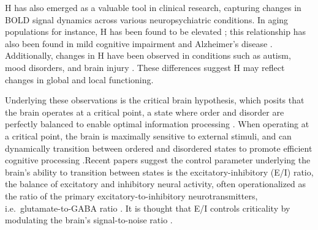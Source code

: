 \documentclass[
true
]{sn-jnl}
\begin{document}
H has also emerged as a valuable tool in clinical research, capturing
changes in BOLD signal dynamics across various neuropsychiatric
conditions. In aging populations for instance, H has been found to be
elevated
\citep{dongHurstExponentAnalysis2018, winkAgeCholinergicEffects2006};
this relationship has also been found in mild cognitive impairment and
Alzheimer's disease
\citep{maximFractionalGaussianNoise2005, longBrainnetomeAtlasBased2018}.
Additionally, changes in H have been observed in conditions such as
autism, mood disorders, and brain injury
\citep{laiShiftRandomnessBrain2010, donaTemporalFractalAnalysis2017, weiIdentifyingMajorDepressive2013, jingIdentifyingCurrentRemitted2017, donaFractalAnalysisBrain2017}.
These differences suggest H may reflect changes in global and local
functioning.

Underlying these observations is the critical brain hypothesis, which
posits that the brain operates at a critical point, a state where order
and disorder are perfectly balanced to enable optimal information
processing
\citep{decoRestingBrainsNever2013, beggsBeingCriticalCriticality2012, barangerChaosComplexityEntropy2000, bassettUnderstandingComplexityHuman2011, zimmernWhyBrainCriticality2020, liangExcitationInhibitionBalance2024, poilCriticalStateDynamicsAvalanches2012, lombardiBalanceExcitationInhibition2017, baumgartenCriticalExcitationinhibitionBalance2019, bruiningMeasurementExcitationinhibitionRatio2020, trakoshisIntrinsicExcitationinhibitionImbalance, gaoInferringSynapticExcitation2017, tianTheoreticalFoundationsStudying2022, rubinovNeurobiologicallyRealisticDeterminants2011}.
When operating at a critical point, the brain is maximally sensitive to
external stimuli, and can dynamically transition between ordered and
disordered states to promote efficient cognitive processing
\citep{decoRestingBrainsNever2013, beggsBeingCriticalCriticality2012, tianTheoreticalFoundationsStudying2022, rubinovNeurobiologicallyRealisticDeterminants2011}.Recent
papers suggest the control parameter underlying the brain's ability to
transition between states is the excitatory-inhibitory (E/I) ratio, the
balance of excitatory and inhibitory neural activity, often
operationalized as the ratio of the primary excitatory-to-inhibitory
neurotransmitters, i.e.~glutamate-to-GABA ratio
\citep{liangExcitationInhibitionBalance2024, lombardiBalanceExcitationInhibition2017, baumgartenCriticalExcitationinhibitionBalance2019, bruiningMeasurementExcitationinhibitionRatio2020, trakoshisIntrinsicExcitationinhibitionImbalance, gaoInferringSynapticExcitation2017}.
It is thought that E/I controls criticality by modulating the brain's
signal-to-noise ratio
\citep{liangExcitationInhibitionBalance2024, rubensteinModelAutismIncreased2003}.
\end{document}

